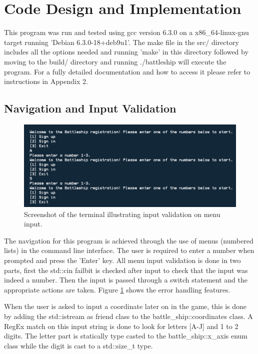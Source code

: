 \documentclass[11pt]{article} %
\begin{document}
\section{Code Design and Implementation}
This program was run and tested using gcc version 6.3.0 on a x86\_64-linux-gnu target running 'Debian 6.3.0-18+deb9u1'.
The make file in the src/ directory includes all the options needed and running 'make' in this directory followed
by moving to the build/ directory and running ./battleship will execute the program.
For a fully detailed documentation and how to access it please refer to instructions in Appendix 2.
\subsection{Navigation and Input Validation}
\begin{figure}[H]
\centering
\includegraphics[scale=0.6]{images/input_validation.png}
\caption{Screenshot of the terminal illustrating input validation on menu input.}
\label{fig:input_validation}
\end{figure}
The navigation for this program is achieved through the use of menus (numbered lists) in the
command line interface.
The user is required to enter a number when prompted and press the 'Enter' key.
All menu input validation is done in two parts, first the std::cin failbit is checked after input
to check that the input was indeed a number.
Then the input is passed through a switch statement and the appropriate actions are taken.
Figure \ref{fig:input_validation} shows the error handling features.
\\
\par When the user is asked to input a coordinate later on in the game, this is done by
adding the std::istream as friend class to the battle\_ship::coordinates class.
A RegEx match on this input string is done to look for letters [A-J] and 1 to 2 digits.
The letter part is statically type casted to the battle\_ship::x\_axis enum class while the digit
is cast to a std::size\_t type.
\end{document}
